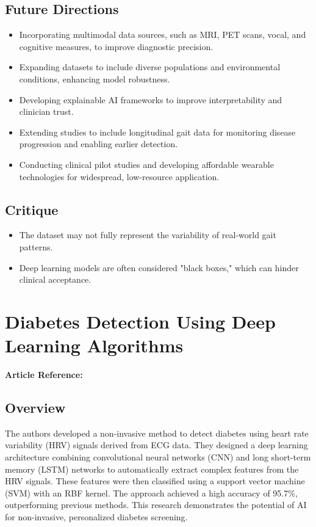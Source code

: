 \subsection*{Future Directions}
\begin{itemize}
    \item Incorporating multimodal data sources, such as MRI, PET scans, vocal, and cognitive measures, to improve diagnostic precision.
    \item Expanding datasets to include diverse populations and environmental conditions, enhancing model robustness.
    \item Developing explainable AI frameworks to improve interpretability and clinician trust.
    \item Extending studies to include longitudinal gait data for monitoring disease progression and enabling earlier detection.
    \item Conducting clinical pilot studies and developing affordable wearable technologies for widespread, low-resource application.
\end{itemize}

\subsection*{Critique}
\begin{itemize}
    \item The dataset may not fully represent the variability of real-world gait patterns.    
    \item Deep learning models are often considered "black boxes," which can hinder clinical acceptance.
\end{itemize}

\section{Diabetes Detection Using Deep Learning Algorithms}
\textbf{Article Reference:} \cite{article_4}

\subsection*{Overview}
The authors developed a non-invasive method to detect diabetes using heart rate variability (HRV) signals derived from ECG data. They designed a deep learning architecture combining convolutional neural networks (CNN) and long short-term memory (LSTM) networks to automatically extract complex features from the HRV signals. These features were then classified using a support vector machine (SVM) with an RBF kernel. The approach achieved a high accuracy of 95.7\%, outperforming previous methods. This research demonstrates the potential of AI for non-invasive, personalized diabetes screening.

